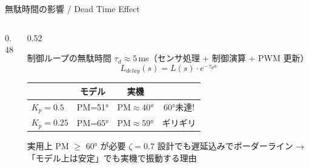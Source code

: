 \begin{frame}{無駄時間の影響 / Dead Time Effect}
  \begin{columns}[c]
    \begin{column}{0.48\textwidth}
      \centering
      \resizebox{\columnwidth}{!}{}
    \end{column}
    \begin{column}{0.52\textwidth}
      \begin{block}{制御ループの無駄時間}\small
        $\tau_d \approx 5$\,ms（センサ処理 + 制御演算 + PWM 更新）
        \vspace{-0.3em}
        \[
          L_{delay}(s) = L(s) \cdot e^{-\tau_d s}
        \]
        \vspace{-1.5em}
      \end{block}

      \vspace{0.2em}

      {\small
      \begin{tabular}{lccc}
        \hline
        & \textbf{モデル} & \textbf{実機} & \\
        \hline
        $K_p\!=\!0.5$  & PM=51° & PM$\approx$40° & {\color{red}60°未達!} \\
        $K_p\!=\!0.25$ & PM=65° & PM$\approx$59° & ギリギリ \\
        \hline
      \end{tabular}}

      \vspace{0.5em}

      \begin{alertblock}{\small 実用上 PM $\geq$ 60° が必要}\scriptsize
        $\zeta\!=\!0.7$ 設計でも遅延込みでボーダーライン
        → 「モデル上は安定」でも実機で振動する理由
      \end{alertblock}
    \end{column}
  \end{columns}
\end{frame}

